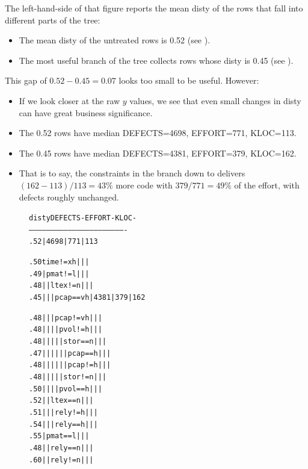 \documentclass[AMA,STIX2COL]{WileyNJDv5}
\newcommand{\disc}[2][black]{%
  \tikz[baseline=(c.base)]%
    \node[circle, fill=#1, draw=#1,
          inner sep=0pt, minimum size=1.2ex,
          text=white, font=\tiny\bfseries]
    (c) {#2};%
}
\newcommand{\rc}[1]{%
  \iftoggle{rcred}{\disc[red]{#1}}{\disc[black]{#1}}%
}
\begin{document}
{The left-hand-side of that figure
reports the mean \textsf{disty} of
the rows that fall into different  parts of the tree:
\begin{itemize}
\item
The mean \textsf{disty} of the
untreated rows is 0.52 (see \rc{1}). 
\item The most useful branch of the tree
collects rows whose \textsf{disty} is 0.45
(see \rc{2}).
\end{itemize}
This gap of $0.52-0.45 = 0.07$ looks too
small to be useful. However:
\begin{itemize}
\item
If we look closer at the raw $y$ values,
we see that   even small
changes in \textsf{disty}
can have great business significance.
\item
The
0.52 rows have median DEFECTS=4698, EFFORT=771, KLOC=113.
\item The
0.45 rows have median DEFECTS=4381, EFFORT=379, KLOC=162.
\item That is to say,
the constraints  in the branch down to 
\rc{2}  delivers $(162-113)/113 = 43\%$ more code with
$379/771 = 49\%$ of the effort, with defects roughly unchanged.
 \end{itemize}
\begin{figure}[!t]
{\fontsize{6pt}{7.2pt}\selectfont
\begin{alltt}
disty                                  DEFECTS-   EFFORT-   KLOC- 
-------------------------------------------------------------------
.52                                |    4698  |    771  |  113 \rc{1}
.50    time != xh                  |          |         |
.49    |  pmat != l                |          |         |
.48    |  |  ltex != n             |          |         |
.45    |  |  |  pcap == vh         |    4381  |    379  |  162 \rc{2}
.48    |  |  |  pcap != vh         |          |         |
.48    |  |  |  |  pvol != h       |          |         |
.48    |  |  |  |  |  stor == n    |          |         |
.47    |  |  |  |  |  |  pcap == h |          |         |
.48    |  |  |  |  |  |  pcap != h |          |         |
.48    |  |  |  |  |  stor != n    |          |         |
.50    |  |  |  |  pvol == h       |          |         |
.52    |  |  ltex == n             |          |         |
.51    |  |  |  rely != h          |          |         |
.54    |  |  |  rely == h          |          |         |
.55    |  pmat == l                |          |         |
.48    |  |  rely == n             |          |         |
.60    |  |  rely != n             |          |         |

\end{alltt}}
\end{figure}}
\end{document}
